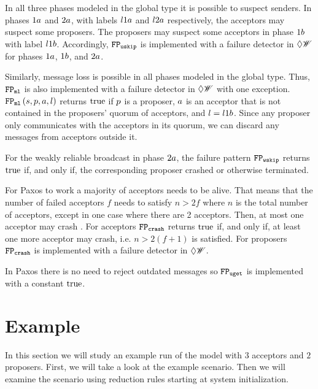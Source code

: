In all three phases modeled in the global type it is possible to suspect senders.
In phases $1a$ and $2a$, with labels $l1a$ and $l2a$ respectively, the acceptors may suspect some proposers.
The proposers may suspect some acceptors in phase $1b$ with label $l1b$.
Accordingly, $\mathtt{FP_{uskip}}$ is implemented with a failure detector in $\Diamond\mathscr{W}$ for phases $1a$, $1b$, and $2a$.

Similarly, message loss is possible in all phases modeled in the global type.
Thus, $\mathtt{FP_{ml}}$ is also implemented with a failure detector in $\Diamond\mathscr{W}$ with one exception.
$\mathtt{FP_{ml}}\left(s,p,a,l\right)$ returns $\operatorname{true}$ if $p$ is a proposer, $a$ is an acceptor that is not contained in the proposers' quorum of acceptors, and $l = l1b$.
Since any proposer only communicates with the acceptors in its quorum, we can discard any messages from acceptors outside it.

For the weakly reliable broadcast in phase $2a$, the failure pattern $\mathtt{FP_{wskip}}$ returns $\operatorname{true}$ if, and only if, the corresponding proposer crashed or otherwise terminated.

For Paxos to work a majority of acceptors needs to be alive.
That means that the number of failed acceptors $f$ needs to satisfy $n > 2f$ where $n$ is the total number of acceptors, except in one case where there are 2 acceptors.
Then, at most one acceptor may crash \cite{lower_bounds}.
For acceptors $\mathtt{FP_{crash}}$ returns $\operatorname{true}$ if, and only if, at least one more acceptor may crash, i.e. $n > 2(f + 1)$ is satisfied.
For proposers $\mathtt{FP_{crash}}$ is implemented with a failure detector in $\Diamond\mathscr{W}$.

In Paxos there is no need to reject outdated messages so $\mathtt{FP_{uget}}$ is implemented with a constant $\operatorname{true}$.


\section{Example}
In this section we will study an example run of the model with $3$ acceptors and $2$ proposers.
First, we will take a look at the example scenario.
Then we will examine the scenario using reduction rules starting at system initialization.


